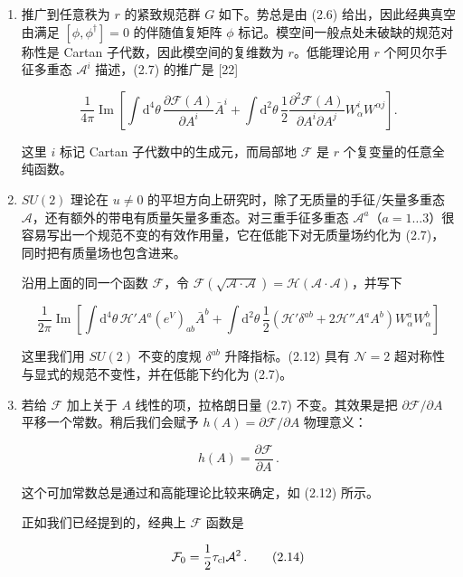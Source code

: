 \documentclass[11pt,a4paper,UTF8,fontset=fandol]{ctexart}
\theoremstyle{plain}
\theoremstyle{definition}
\begin{document}
\begin{enumerate}
\begin{equation}
\tau(a)=\frac{\partial^2\mathcal F}{\partial a^2}\,.\tag{2.10}
\end{equation}

\item 推广到任意秩为 $r$ 的紧致规范群 $G$ 如下。势总是由 (2.6) 给出，因此经典真空由满足 $[\phi,\phi^\dagger]=0$ 的伴随值复矩阵 $\phi$ 标记。模空间一般点处未破缺的规范对称性是 Cartan 子代数，因此模空间的复维数为 $r$。低能理论用 $r$ 个阿贝尔手征多重态 $\mathcal A^i$ 描述，(2.7) 的推广是 [22]

\begin{equation}
\frac{1}{4\pi}\operatorname{Im}\left[\int \mathrm{d}^4\theta\,\frac{\partial\mathcal F(A)}{\partial A^i}\bar A^i+\int \mathrm{d}^2\theta\,\frac12\frac{\partial^2\mathcal F(A)}{\partial A^i\partial A^j}W^i_\alpha W^{\alpha j}\right].\tag{2.11}
\end{equation}

这里 $i$ 标记 Cartan 子代数中的生成元，而局部地 $\mathcal F$ 是 $r$ 个复变量的任意全纯函数。

\item $SU(2)$ 理论在 $u\neq 0$ 的平坦方向上研究时，除了无质量的手征/矢量多重态 $\mathcal A$，还有额外的带电有质量矢量多重态。对三重手征多重态 $\mathcal A^a$（$a=1\ldots 3$）很容易写出一个规范不变的有效作用量，它在低能下对无质量场约化为 (2.7)，同时把有质量场也包含进来。

沿用上面的同一个函数 $\mathcal F$，令 $\mathcal F(\sqrt{\mathcal A\cdot\mathcal A})=\mathcal H(\mathcal A\cdot\mathcal A)$，并写下

\begin{equation}
\frac{1}{2\pi}\operatorname{Im}\left[\int \mathrm{d}^4\theta\,\mathcal H' A^a (e^V)_{ab}\bar A^b+\int \mathrm{d}^2\theta\,\frac12\left(\mathcal H'\delta^{ab}+2\mathcal H'' A^a A^b\right)W^a_\alpha W^b_\alpha\right]\tag{2.12}
\end{equation}

这里我们用 $SU(2)$ 不变的度规 $\delta^{ab}$ 升降指标。(2.12) 具有 $\mathcal N=2$ 超对称性与显式的规范不变性，并在低能下约化为 (2.7)。

\item 若给 $\mathcal F$ 加上关于 $A$ 线性的项，拉格朗日量 (2.7) 不变。其效果是把 $\partial\mathcal F/\partial A$ 平移一个常数。稍后我们会赋予 $h(A)=\partial\mathcal F/\partial A$ 物理意义：

\begin{equation}
h(A)=\frac{\partial\mathcal F}{\partial A}\,.\tag{2.13}
\end{equation}

这个可加常数总是通过和高能理论比较来确定，如 (2.12) 所示。

正如我们已经提到的，经典上 $\mathcal F$ 函数是

\begin{equation}
\mathcal F_0=\frac12\tau_{\rm cl}\mathcal A^2\,.\tag{2.14}
\end{equation}
\end{enumerate}
\end{document}
